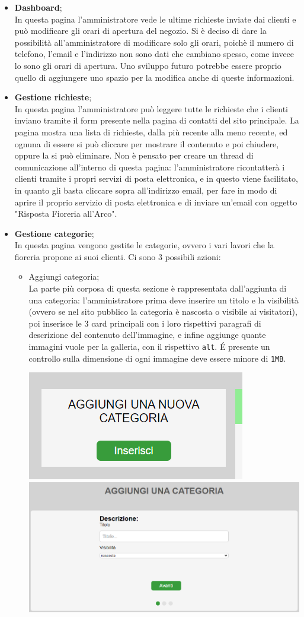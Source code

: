 	\begin{itemize}
		\item \textbf{Dashboard};\\In questa pagina l'amministratore vede le ultime richieste inviate dai clienti e può modificare gli orari di apertura del negozio. Si è deciso di dare la possibilità all'amministratore di modificare solo gli orari, poichè il numero di telefono, l'email e l'indirizzo non sono dati che cambiano spesso, come invece lo sono gli orari di apertura. Uno sviluppo futuro potrebbe essere proprio quello di aggiungere uno spazio per la modifica anche di queste informazioni.
		\item \textbf{Gestione richieste};\\In questa pagina l'amministratore può leggere tutte le richieste che i clienti inviano tramite il form presente nella pagina di contatti del sito principale. La pagina mostra una lista di richieste, dalla più recente alla meno recente, ed ognuna di essere  si può cliccare per mostrare il contenuto e poi chiudere, oppure la si può eliminare. Non è pensato per creare un thread di comunicazione all'interno di questa pagina: l'amministratore ricontatterà i clienti tramite i propri servizi di posta elettronica, e in questo viene facilitato, in quanto gli basta cliccare sopra all'indirizzo email, per fare in modo di aprire il proprio servizio di posta elettronica e di inviare un'email con oggetto "Risposta Fioreria all'Arco".		
\item \textbf{Gestione categorie};\\In questa pagina vengono gestite le categorie, ovvero i vari lavori che la fioreria propone ai suoi clienti. Ci sono 3 possibili azioni:
\begin{itemize}
	\item Aggiungi categoria;\\La parte più corposa di questa sezione è rappresentata dall'aggiunta di una categoria: l'amministratore prima deve inserire un titolo e la visibilità (ovvero se nel sito pubblico la categoria è nascosta o visibile ai visitatori), poi inserisce le 3 card principali con i loro rispettivi paragrafi di descrizione del contenuto dell'immagine, e infine aggiunge quante immagini vuole per la galleria, con il rispettivo \texttt{alt}. 
É presente un controllo sulla dimensione di ogni immagine deve essere minore di \texttt{1MB}.
\begin{center}
\includegraphics[width = 0.25 \textwidth]{../latex/images/aggiungi.png}\hspace{1em}\includegraphics[width = 0.4 \textwidth]{../latex/images/pt2.png}

\end{center}
\end{itemize}
\end{itemize}
